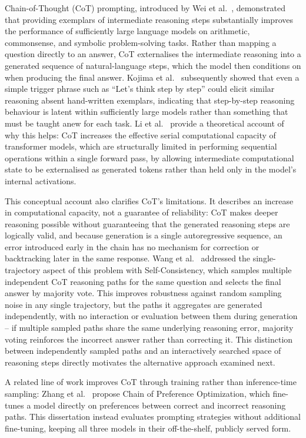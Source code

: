 Chain-of-Thought (CoT) prompting, introduced by Wei et
al.~\cite{wei2022chain}, demonstrated that providing exemplars of
intermediate reasoning steps substantially improves the performance of
sufficiently large language models on arithmetic, commonsense, and
symbolic problem-solving tasks. Rather than mapping a question directly to
an answer, CoT externalises the intermediate reasoning into a generated
sequence of natural-language steps, which the model then conditions on
when producing the final answer. Kojima et
al.~\cite{kojima2022zeroshot} subsequently showed that even a simple
trigger phrase such as ``Let's think step by step'' could elicit similar
reasoning absent hand-written exemplars, indicating that step-by-step
reasoning behaviour is latent within sufficiently large models rather than
something that must be taught anew for each task. Li et
al.~\cite{li2024serial} provide a theoretical account of why this helps:
CoT increases the effective serial computational capacity of transformer
models, which are structurally limited in performing sequential operations
within a single forward pass, by allowing intermediate computational state
to be externalised as generated tokens rather than held only in the
model's internal activations.

This conceptual account also clarifies CoT's limitations. It describes an
increase in computational capacity, not a guarantee of reliability: CoT
makes deeper reasoning possible without guaranteeing that the generated
reasoning steps are logically valid, and because generation is a single
autoregressive sequence, an error introduced early in the chain has no
mechanism for correction or backtracking later in the same response. Wang
et al.~\cite{wang2023selfconsistency} addressed the single-trajectory
aspect of this problem with Self-Consistency, which samples multiple
independent CoT reasoning paths for the same question and selects the
final answer by majority vote. This improves robustness against random
sampling noise in any single trajectory, but the paths it aggregates are
generated independently, with no interaction or evaluation between them
during generation -- if multiple sampled paths share the same underlying
reasoning error, majority voting reinforces the incorrect answer rather
than correcting it. This distinction between independently sampled paths
and an interactively searched space of reasoning steps directly motivates
the alternative approach examined next.

A related line of work improves CoT through training rather than
inference-time sampling: Zhang et al.~\cite{zhang2024preference} propose
Chain of Preference Optimization, which fine-tunes a model directly on
preferences between correct and incorrect reasoning paths. This
dissertation instead evaluates prompting strategies without additional
fine-tuning, keeping all three models in their off-the-shelf, publicly
served form.

